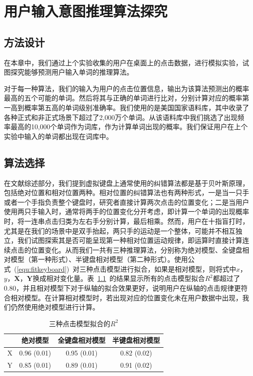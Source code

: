 \chapter{用户输入意图推理算法探究}
\label{cha:algorithm}
\section{方法设计}
在本章中，我们通过上个实验收集的用户在桌面上的点击数据，进行模拟实验，试图探究能够预测用户输入单词的推理算法。

对于每一种算法，我们的输入为用户的点击位置信息，输出为该算法预测出的概率最高的五个可能的单词。然后将其与正确的单词进行比对，分别计算对应的概率第一高到概率第五高的单词级别准确率。我们使用的是美国国家语料库，其中收录了各种正式和非正式场景下超过了2,000万个单词。从该语料库中我们挑选了出现频率最高的10,000个单词作为词库，作为计算单词出现的概率。我们保证用户在上个实验中输入的单词都出现在词库中。

\section{算法选择}
在文献综述部分，我们提到虚拟键盘上通常使用的纠错算法都是基于贝叶斯原理，包括绝对位置和相对位置两种。相对位置的纠错算法也有两种形式，一是当一只手或者一个手指负责整个键盘时，研究者直接计算两次点击的位置变化；二是当用户使用两只手输入时，通常将两手的位置变化分开考虑，即计算一个单词的出现概率时，将一连串点击归类为左右手分别计算，最后相乘。然而，用户在十指盲打时，尤其是在我们的场景中是双手抬起，两只手的运动是一个整体，可能并不相互独立，我们试图探索其是否可能呈现第一种相对位置运动规律，即运算时直接计算连续点击的位置变化。从而我们一共有三种推理算法，分别称为绝对模型、全键盘相对模型（第一种形式）、半键盘相对模型（第二种形式）。使用公式~(\ref{equ:fitkeyboard})~对三种点击模型进行拟合，如果是相对模型，则将式中$x$，$y$，$\textbf{X}$，$\textbf{Y}$换成相对变化量。表~\ref{tab:modelr2}~的结果显示所有的点击模型拟合$R^2$都超过了0.80，并且相对模型下对于纵轴的拟合效果更好，说明用户在纵轴的点击规律更符合相对模型。在计算相对模型时，若出现对应的位置变化未在用户数据中出现，我们仍然使用绝对模型进行计算。

\begin{table}[htb]
  \centering
  \begin{minipage}[t]{0.6\linewidth} %
  \caption[三种点击模型拟合的$R^{2}$]{三种点击模型拟合的$R^{2}$}
  \label{tab:modelr2}
    \centering
    \begin{tabularx}{\linewidth}{cccc}
      \toprule[1.5pt]
      & 绝对模型 & 全键盘相对模型 & 半键盘相对模型 \\\midrule[1pt]
      X & 0.96 (0.01) & 0.95 (0.01) & 0.82 (0.02) \\
      Y & 0.85 (0.01) & 0.89 (0.01) & 0.91 (0.02) \\
      \bottomrule[1.5pt]
    \end{tabularx}
  \end{minipage}
\end{table}

